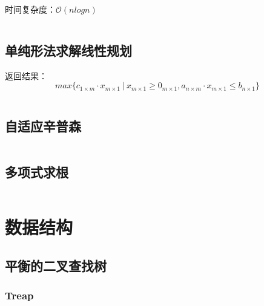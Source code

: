 \documentclass[landscape, twoside, a4paper]{article}
\newcommand{\cppcode}[1]{
	\inputminted[mathescape,
	frame=lines,linenos]{cpp}{source/#1}
}
\begin{document}
\begin{multicols}{2}
\begin{spacing}{0.8}
\indent 时间复杂度：$\mathcal{O}(n log n)$


\cppcode{numerical-algorithm/fast-fourier-transform.cpp}


\subsection{单纯形法求解线性规划}


返回结果：$$max\{c_{1 \times m} \cdot x_{m \times 1} \ | \ x_{m \times 1} \geq 0_{m \times 1}, a_{n \times m} \cdot x_{m \times 1} \leq b_{n \times 1}\}$$


\cppcode{numerical-algorithm/linear-programming-simplex.cpp}


\subsection{自适应辛普森}


\cppcode{numerical-algorithm/adaptive-simpson.cpp}



\subsection{多项式求根}


\cppcode{numerical-algorithm/polyroot.cpp}








\section{数据结构}


\subsection{平衡的二叉查找树}


\subsubsection{Treap}



\end{spacing}
\end{multicols}
\end{document}
